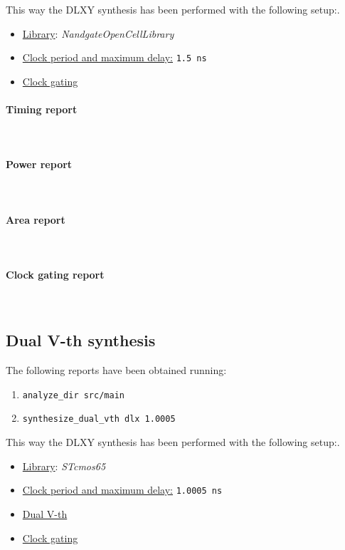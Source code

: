 \bigskip
This way the DLXY synthesis has been performed with the following setup:.
\begin{itemize}
	\item \underline{Library}: \textit{NandgateOpenCellLibrary}
	\item \underline{Clock period and maximum delay:} \texttt{1.5 ns}
	\item \underline{Clock gating}
\end{itemize}

\paragraph{Timing report} \mbox{} \\

\paragraph{Power report} \mbox{} \\

\paragraph{Area report} \mbox{} \\

\paragraph{Clock gating report} \mbox{} \\


\subsection{Dual V-th synthesis}
The following reports have been obtained running:
\begin{enumerate}
	\item \texttt{analyze\_dir src/main}
	\item \texttt{synthesize\_dual\_vth dlx 1.0005}
\end{enumerate}

\bigskip
This way the DLXY synthesis has been performed with the following setup:.
\begin{itemize}
	\item \underline{Library}: \textit{STcmos65}
	\item \underline{Clock period and maximum delay:} \texttt{1.0005 ns}
	\item \underline{Dual V-th}
	\item \underline{Clock gating}
\end{itemize}

